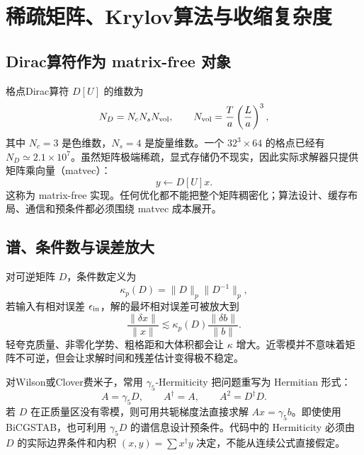 \documentclass[UTF8,12pt,a4paper,twoside,openany]{ctexbook}
\begin{document}
\clearpage


\clearpage
\chapter{稀疏矩阵、Krylov算法与收缩复杂度}
\label{sec:krylov-algorithms}

\section{Dirac算符作为 matrix-free 对象}

格点Dirac算符 \(D[U]\) 的维数为
\begin{equation}
  N_D=N_cN_sN_{\rm vol},
  \qquad
  N_{\rm vol}=\frac{T}{a}\left(\frac{L}{a}\right)^3,
  \label{eq:dirac-dimension}
\end{equation}
其中 \(N_c=3\) 是色维数，\(N_s=4\) 是旋量维数。一个 \(32^3\times64\) 的格点已经有 \(N_D\simeq2.1\times10^7\)。虽然矩阵极端稀疏，显式存储仍不现实，因此实际求解器只提供矩阵乘向量（matvec）：
\begin{equation}
  y\gets D[U]x.
  \label{eq:matvec}
\end{equation}
这称为 matrix-free 实现。任何优化都不能把整个矩阵稠密化；算法设计、缓存布局、通信和预条件都必须围绕 matvec 成本展开。

\section{谱、条件数与误差放大}

对可逆矩阵 \(D\)，条件数定义为
\begin{equation}
  \kappa_p(D)=\|D\|_p\|D^{-1}\|_p,
  \label{eq:condition-number}
\end{equation}
若输入有相对误差 \(\epsilon_{\rm in}\)，解的最坏相对误差可被放大到
\begin{equation}
  \frac{\|\delta x\|}{\|x\|}
  \lesssim\kappa_p(D)\frac{\|\delta b\|}{\|b\|}.
  \label{eq:condition-amplification}
\end{equation}
轻夸克质量、非零化学势、粗格距和大体积都会让 \(\kappa\) 增大。近零模并不意味着矩阵不可逆，但会让求解时间和残差估计变得极不稳定。

对Wilson或Clover费米子，常用 \(\gamma_5\)-Hermiticity 把问题重写为 Hermitian 形式：
\begin{equation}
  A=\gamma_5 D,
  \qquad A^\dagger=A,
  \qquad A^2=D^\dagger D.
  \label{eq:gamma5-hermitian}
\end{equation}
若 \(D\) 在正质量区没有零模，则可用共轭梯度法直接求解 \(Ax=\gamma_5b\)。即使使用BiCGSTAB，也可利用 \(\gamma_5 D\) 的谱信息设计预条件。代码中的 Hermiticity 必须由 \(D\) 的实际边界条件和内积 \((x,y)=\sum x^\dagger y\) 决定，不能从连续公式直接假定。
\end{document}
